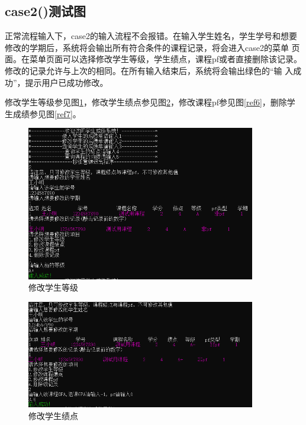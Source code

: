 \documentclass[fontset=windows]{article}
\begin{document}
\subsection{case2()测试图}


正常流程输入下，case2的输入流程不会报错。在输入学生姓名，学生学号和想要修改的学期后，系统将会输出所有符合条件的课程记录，将会进入case2的菜单
页面。在菜单页面可以选择修改学生等级，学生绩点，课程pf或者直接删除该记录。修改的记录允许与上次的相同。在所有输入结束后，系统将会输出绿色的“输
入成功”，提示用户已成功修改。

修改学生等级参见图\ref{ref4}，修改学生绩点参见图\ref{ref5}，修改课程pf参见图\ref{ref6}，删除学生成绩参见图\ref{ref7}。

\begin{figure}[h!]
	\begin{center}
		\includegraphics[width = 10cm]{修改学生等级.png}
		\caption{修改学生等级}
		\label{ref4}
		\end{center}
\end{figure}

\begin{figure}[h!]
	\begin{center}
		\vspace{-0.3cm}
		\includegraphics[width = 10cm]{修改学生绩点.png}
		\caption{修改学生绩点}
		\label{ref5}
	\end{center}
\end{figure}
\end{document}
